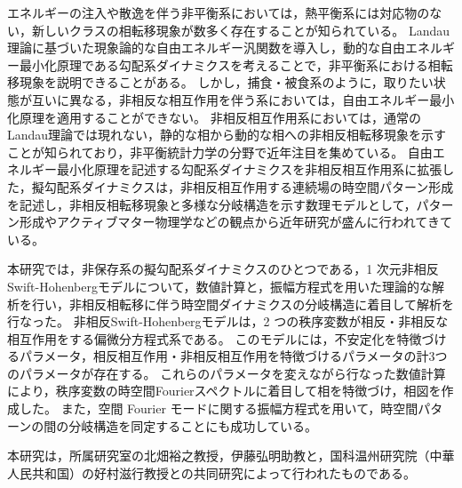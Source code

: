 \documentclass[autodetect-engine,dvi=dvipdfmx,a4paper,ja=standard,oneside,openany,11pt,draft]{bxjsbook}
\begin{document}
エネルギーの注入や散逸を伴う非平衡系においては，熱平衡系には対応物のない，新しいクラスの相転移現象が数多く存在することが知られている。
Landau理論に基づいた現象論的な自由エネルギー汎関数を導入し，動的な自由エネルギー最小化原理である勾配系ダイナミクスを考えることで，非平衡系における相転移現象を説明できることがある。
しかし，捕食・被食系のように，取りたい状態が互いに異なる，非相反な相互作用を伴う系においては，自由エネルギー最小化原理を適用することができない。
非相反相互作用系においては，通常のLandau理論では現れない，静的な相から動的な相への非相反相転移現象を示すことが知られており，非平衡統計力学の分野で近年注目を集めている。
自由エネルギー最小化原理を記述する勾配系ダイナミクスを非相反相互作用系に拡張した，擬勾配系ダイナミクスは，非相反相互作用する連続場の時空間パターン形成を記述し，非相反相転移現象と多様な分岐構造を示す数理モデルとして，パターン形成やアクティブマター物理学などの観点から近年研究が盛んに行われてきている。

本研究では，非保存系の擬勾配系ダイナミクスのひとつである，1 次元非相反Swift-Hohenbergモデルについて，数値計算と，振幅方程式を用いた理論的な解析を行い，非相反相転移に伴う時空間ダイナミクスの分岐構造に着目して解析を行なった。
非相反Swift-Hohenbergモデルは，2 つの秩序変数が相反・非相反な相互作用をする偏微分方程式系である。
このモデルには，不安定化を特徴づけるパラメータ，相反相互作用・非相反相互作用を特徴づけるパラメータの計3つのパラメータが存在する。
これらのパラメータを変えながら行なった数値計算により，秩序変数の時空間Fourierスペクトルに着目して相を特徴づけ，相図を作成した。
また，空間 Fourier モードに関する振幅方程式を用いて，時空間パターンの間の分岐構造を同定することにも成功している。

本研究は，所属研究室の北畑裕之教授，伊藤弘明助教と，国科温州研究院（中華人民共和国）の好村滋行教授との共同研究によって行われたものである。
\end{document}
